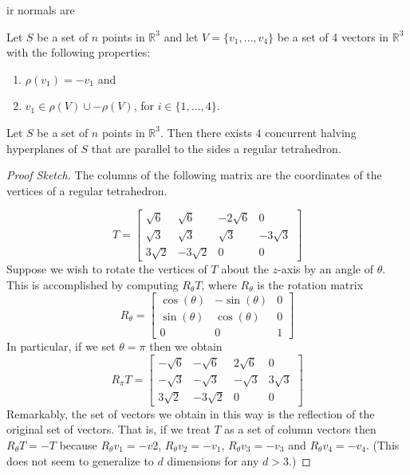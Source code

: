 \documentclass[lotsofwhite]{patmorin}
\begin{document}
ir normals are 


\begin{lem}
Let $S$ be a set of $n$ points in $\mathbb{R}^3$ and let
$V=\{v_1,\ldots,v_4\}$ be a set of 4 vectors in $\mathbb{R}^3$ with
the following properties:
\begin{enumerate}
\item $\rho(v_1)=-v_1$ and 
\item $v_1\in\rho(V)\cup -\rho(V)$, for $i\in\{1,\ldots,4\}$.
\end{enumerate}
\end{lem}





\begin{lem}
Let $S$ be a set of $n$ points in $\mathbb{R}^3$.  Then there exists
$4$ concurrent halving hyperplanes of $S$ that are parallel to the
sides a regular tetrahedron.
\end{lem}

\begin{proof}[Proof Sketch]
The columns of the following matrix are the coordinates of the
vertices of a regular tetrahedron.

\[T=\left[\begin{array}{cccccc}
  \sqrt{6} & \sqrt{6} & -2\sqrt{6} & 0 \\
  \sqrt{3} & \sqrt{3} & \sqrt{3} & -3\sqrt{3} \\
  3\sqrt{2} & -3\sqrt{2} & 0 & 0
\end{array} \right]
\]
Suppose we wish to 
rotate
the vertices of $T$ about the $z$-axis by an angle of $\theta$.
This is accomplished by computing 
$R_\theta T$, where $R_\theta$ is the rotation
matrix
\[R_\theta=\left[\begin{array}{ccccc}
   \cos(\theta)  & -\sin(\theta)  & 0 \\
   \sin(\theta)  & \cos(\theta)   & 0 \\
   0           & 0           & 1  
\end{array}\right]\]
In particular, if we set $\theta=\pi$ then we obtain
\[R_\pi T=\left[\begin{array}{cccccc}
  -\sqrt{6} & -\sqrt{6} & 2\sqrt{6} & 0 \\
  -\sqrt{3} & -\sqrt{3} & -\sqrt{3} & 3\sqrt{3} \\
  3\sqrt{2} & -3\sqrt{2} & 0 & 0
\end{array} \right]
\]
Remarkably, the set of vectors we obtain in this way is the reflection
of the original set of vectors.  That is, if we treat $T$ as a set of
column vectors then $R_\theta T=-T$ because $R_\theta v_1=-v2$,
$R_\theta v_2=-v_1$, $R_\theta v_3=-v_3$ and $R_\theta v_4=-v_4$.
(This does not seem to generalize to $d$ dimensions for any $d>3$.)
\end{proof}
\end{document}
